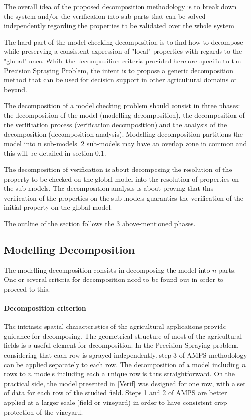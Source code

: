 
The overall idea of the proposed decomposition methodology is to break down the system and/or the verification into sub-parts that can be solved independently regarding the properties to be validated over the whole system.

The hard part of the model checking decomposition is to find how to decompose while preserving a consistent expression of "local" properties with regards to the "global" ones. While the decomposition criteria provided here are specific to the Precision Spraying Problem, the intent is to propose a generic decomposition method that can be used for decision support in other agricultural domains or beyond.

The decomposition of a model checking problem should consist in three phases: the decomposition of the model (modelling decomposition), the decomposition of the verification process (verification decomposition) and the analysis of the decomposition (decomposition analysis). Modelling decomposition partitions the model into n sub-models. 2 sub-models may have an overlap zone in common and this will be detailed in section \ref{MD}.

The decomposition of verification is about decomposing the resolution of the property to be checked on the global model into the resolution of properties on the sub-models. The decomposition analysis is about proving that this verification of the properties on the sub-models guaranties the verification of the initial property on the global model.

The outline of the section follows the 3 above-mentioned phases.

\subsection{Modelling Decomposition}
\label{MD}

The modelling decomposition consists in decomposing the model into $n$ parts. One or several criteria for decomposition need to be found out in order to proceed to this.

\paragraph{\textbf{Decomposition criterion}} 

The intrinsic spatial characteristics of the agricultural applications provide guidance for decomposing. The geometrical structure of most of the agricultural fields is a useful element for decomposition. In the Precision Spraying problem, considering that each row is sprayed independently, step 3 of AMPS methodology can be applied separately to each row. The decomposition of a model including $n$ rows to $n$ models including each a unique row is thus straightforward. On the practical side, the model presented in \ref{Verif} was designed for one row, with a set of data for each row of the studied field.
Steps 1 and 2 of AMPS are better applied at a larger scale (field or vineyard) in order to have consistent crop protection of the vineyard.

